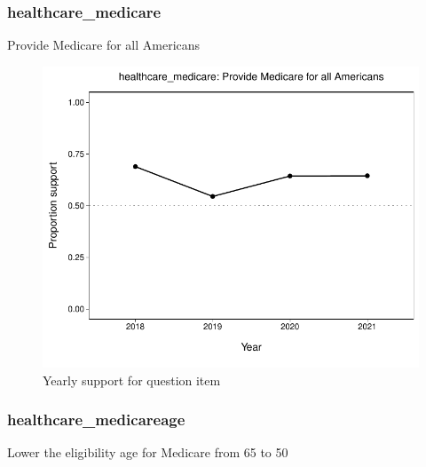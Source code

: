 \documentclass[
  12pt]{article}
\begin{document}
\hypertarget{healthcare_medicare}{%
\subsubsection{healthcare\_medicare}\label{healthcare_medicare}}

Provide Medicare for all Americans

\begin{figure}

{\centering \includegraphics{error-checking_files/figure-latex/unnamed-chunk-3-18} 

}

\caption{Yearly support for question item}\label{fig:unnamed-chunk-3-18}
\end{figure}

\hypertarget{healthcare_medicareage}{%
\subsubsection{healthcare\_medicareage}\label{healthcare_medicareage}}

Lower the eligibility age for Medicare from 65 to 50
\end{document}
